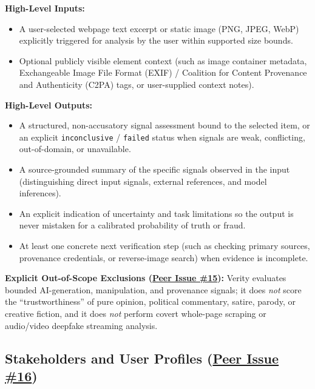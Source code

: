 \documentclass[11pt]{article}
\begin{document}
\noindent\textbf{High-Level Inputs:}
\begin{itemize}[leftmargin=2em]
    \item A user-selected webpage text excerpt or static image (PNG, JPEG, WebP) explicitly triggered for analysis by the user within supported size bounds.
    \item Optional publicly visible element context (such as image container metadata, Exchangeable Image File Format (EXIF) / Coalition for Content Provenance and Authenticity (C2PA) tags, or user-supplied context notes).
\end{itemize}

\noindent\textbf{High-Level Outputs:}
\begin{itemize}[leftmargin=2em]
    \item A structured, non-accusatory signal assessment bound to the selected item, or an explicit \texttt{inconclusive} / \texttt{failed} status when signals are weak, conflicting, out-of-domain, or unavailable.
    \item A source-grounded summary of the specific signals observed in the input (distinguishing direct input signals, external references, and model inferences).
    \item An explicit indication of uncertainty and task limitations so the output is never mistaken for a calibrated probability of truth or fraud.
    \item At least one concrete next verification step (such as checking primary sources, provenance credentials, or reverse-image search) when evidence is incomplete.
\end{itemize}

\noindent\textbf{Explicit Out-of-Scope Exclusions (\href{https://github.com/richy1337/Verity/issues/15}{Peer Issue \#15}):} Verity evaluates bounded AI-generation, manipulation, and provenance signals; it does \emph{not} score the ``trustworthiness'' of pure opinion, political commentary, satire, parody, or creative fiction, and it does \emph{not} perform covert whole-page scraping or audio/video deepfake streaming analysis.

\subsection{Stakeholders and User Profiles (\href{https://github.com/richy1337/Verity/issues/16}{Peer Issue \#16})}
\end{document}
